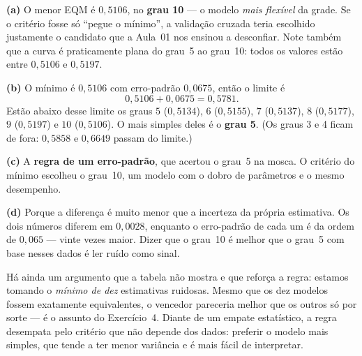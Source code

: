 \documentclass[11pt,a4paper]{article}
\begin{document}
\begin{solucao}
\textbf{(a)} O menor EQM é $0{,}5106$, no \textbf{grau 10} --- o modelo
\emph{mais flexível} da grade. Se o critério fosse só ``pegue o mínimo'', a
validação cruzada teria escolhido justamente o candidato que a Aula~01 nos
ensinou a desconfiar. Note também que a curva é praticamente plana do grau~5 ao
grau~10: todos os valores estão entre $0{,}5106$ e $0{,}5197$.

\smallskip
\textbf{(b)} O mínimo é $0{,}5106$ com erro-padrão $0{,}0675$, então o limite é
\[
  0{,}5106+0{,}0675=0{,}5781 .
\]
Estão abaixo desse limite os graus $5$ ($0{,}5134$), $6$ ($0{,}5155$), $7$
($0{,}5137$), $8$ ($0{,}5177$), $9$ ($0{,}5197$) e $10$ ($0{,}5106$). O mais
simples deles é o \textbf{grau 5}. (Os graus 3 e 4 ficam de fora: $0{,}5858$ e
$0{,}6649$ passam do limite.)

\smallskip
\textbf{(c)} A \textbf{regra de um erro-padrão}, que acertou o grau~5 na mosca. O
critério do mínimo escolheu o grau~10, um modelo com o dobro de parâmetros e o
mesmo desempenho.

\smallskip
\textbf{(d)} Porque a diferença é muito menor que a incerteza da própria
estimativa. Os dois números diferem em $0{,}0028$, enquanto o erro-padrão de cada
um é da ordem de $0{,}065$ --- vinte vezes maior. Dizer que o grau~10 é melhor
que o grau~5 com base nesses dados é ler ruído como sinal.

Há ainda um argumento que a tabela não mostra e que reforça a regra: estamos
tomando o \emph{mínimo de dez} estimativas ruidosas. Mesmo que os dez modelos
fossem exatamente equivalentes, o vencedor pareceria melhor que os outros só por
sorte --- é o assunto do Exercício~4. Diante de um empate estatístico, a regra
desempata pelo critério que não depende dos dados: preferir o modelo mais
simples, que tende a ter menor variância e é mais fácil de interpretar.
\end{solucao}
\end{document}
